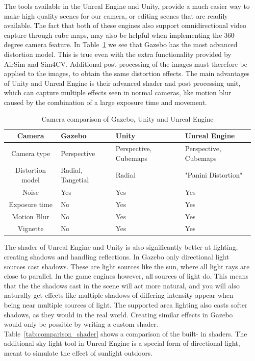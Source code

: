 The tools available in the Unreal Engine and Unity, provide a much easier way to make high quality scenes for our camera, or editing scenes that are readily available. The fact that both of these engines also support omnidirectional video capture through cube maps, may also be helpful when implementing the 360 degree camera feature. In Table~\ref{tab:comparison_camera} we see that Gazebo has the most advanced distortion model. This is true even with the extra functionality provided by AirSim and Sim4CV. Additional post processing of the images must therefore be applied to the images, to obtain the same distortion effects. The main advantages of Unity and Unreal Engine is their advanced shader and post processing unit, which can capture multiple effects seen in normal cameras, like motion blur caused by the combination of a large exposure time and movement.

\begin{table}[!htb]
    \centering
    \begin{tabular}{|c|>{\centering\arraybackslash}m{4cm}|>{\centering\arraybackslash}m{4cm}|>{\centering\arraybackslash}m{4cm}|} \hline
        \textbf{Camera} & \textbf{Gazebo} & \textbf{Unity} & \textbf{Unreal Engine} \\ \hline\hline
        Camera type     & Perspective & Perspective, Cubemaps & Perspective, Cubemaps \\ \hline
        Distortion model & Radial, Tangetial & Radial  & "Panini Distortion"\cite{panini} \\ \hline
        Noise           & Yes & Yes & Yes \\ \hline
        Exposure time   & No & Yes & Yes \\ \hline
        Motion Blur     & No & Yes & Yes \\ \hline
        Vignette        & No & Yes & Yes \\ \hline
        
    \end{tabular}
    \caption{Camera comparison of Gazebo, Unity and Unreal Engine}
    \label{tab:comparison_camera}
\end{table}

The shader of Unreal Engine and Unity is also significantly better at lighting, creating shadows and handling reflections. In Gazebo only directional light sources cast shadows. These are light sources like the sun, where all light rays are close to parallel. In the game engines however, all sources of light do. This means that the the shadows cast in the scene will act more natural, and you will also naturally get effects like multiple shadows of differing intensity appear when being near multiple sources of light. The supported area lighting also casts softer shadows, as they would in the real world. Creating similar effects in Gazebo would only be possible by writing a custom shader. Table~\ref{tab:comparison_shader} shows a comparison of the built- in shaders. The additional sky light tool in Unreal Engine is a special form of directional light, meant to simulate the effect of sunlight outdoors.


